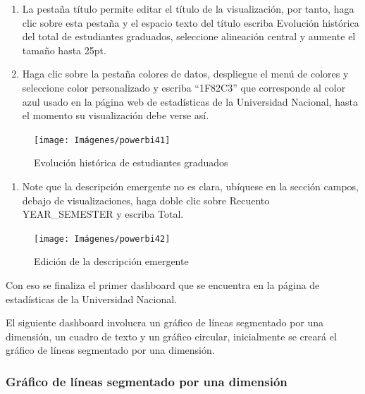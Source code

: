 \documentclass[
]{book}
\providecommand{\tightlist}{%
  \setlength{\itemsep}{0pt}\setlength{\parskip}{0pt}}
\begin{document}
\begin{enumerate}
\def\labelenumi{\arabic{enumi}.}
\setcounter{enumi}{8}
\item
  La pestaña título permite editar el título de la visualización, por tanto, haga clic sobre esta pestaña y el espacio texto del título escriba Evolución histórica del total de estudiantes graduados, seleccione alineación central y aumente el tamaño hasta 25pt.
\item
  Haga clic sobre la pestaña colores de datos, despliegue el menú de colores y seleccione color personalizado y escriba ``1F82C3'' que corresponde al color azul usado en la página web de estadísticas de la Universidad Nacional, hasta el momento su visualización debe verse así.
\end{enumerate}

\begin{figure}

{\centering \texttt{[image: Imágenes/powerbi41]} 

}

\caption{Evolución histórica de estudiantes graduados}\label{fig:paso10lineaspowerbi-fig}
\end{figure}

\begin{enumerate}
\def\labelenumi{\arabic{enumi}.}
\setcounter{enumi}{10}
\tightlist
\item
  Note que la descripción emergente no es clara, ubíquese en la sección campos, debajo de visualizaciones, haga doble clic sobre Recuento YEAR\_SEMESTER y escriba Total.
\end{enumerate}

\begin{figure}

{\centering \texttt{[image: Imágenes/powerbi42]} 

}

\caption{Edición de la descripción emergente}\label{fig:paso11lineaspowerbi-fig}
\end{figure}

Con eso se finaliza el primer dashboard que se encuentra en la página de estadísticas de la Universidad Nacional.

El siguiente dashboard involucra un gráfico de líneas segmentado por una dimensión, un cuadro de texto y un gráfico circular, inicialmente se creará el gráfico de líneas segmentado por una dimensión.

\hypertarget{graficodelineassegmentadopowerbi}{%
\subsubsection{Gráfico de líneas segmentado por una dimensión}\label{graficodelineassegmentadopowerbi}}
\end{document}

